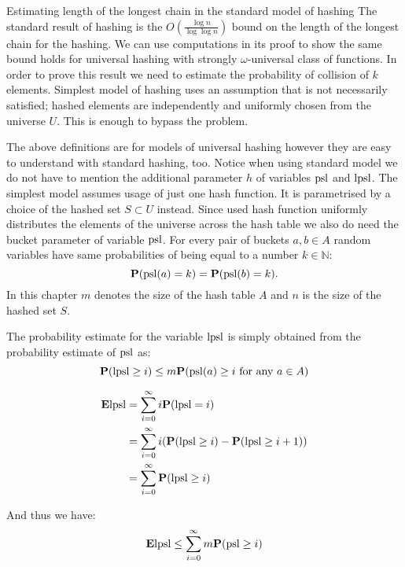 \begin{section}{Estimating length of the longest chain in the standard model of hashing}
The standard result of hashing is the $O\left(\frac{\log n}{\log \log n}\right)$ bound on the length of the longest chain for the hashing. We can use computations in its proof to show the same bound holds for universal hashing with strongly $\omega$-universal class of functions. In order to prove this result we need to estimate the probability of collision of $k$ elements. Simplest model of hashing uses an assumption that is not necessarily satisfied; hashed elements are independently and uniformly chosen from the universe $U$. This is enough to bypass the problem. 

The above definitions are for models of universal hashing however they are easy to understand with standard hashing, too. Notice when using standard model we do not have to mention the additional parameter $h$ of variables $\mathrm{psl}$ and $\mathrm{lpsl}$. The simplest model assumes usage of just one hash function. It is parametrised by a choice of the hashed set $S \subset U$ instead. Since used hash function uniformly distributes the elements of the universe across the hash table we also do need the bucket parameter of variable $\mathrm{psl}$. For every pair of buckets $a, b \in A$ random variables have same probabilities of being equal to a number $k \in \mathbb{N}$: \[\mathbf{P}(\mathrm{psl}(a) = k) = \mathbf{P}(\mathrm{psl}(b) = k) \text{.}\] In this chapter $m$ denotes the size of the hash table $A$ and $n$ is the size of the hashed set $S$.

The probability estimate for the variable $\mathrm{lpsl}$ is simply obtained from the probability estimate of $\mathrm{psl}$ as:
\begin{displaymath}
\mathbf{P}(\mathrm{lpsl} \geq i) \leq m \mathbf{P}(\mathrm{psl}(a) \geq i \text{ for any } a \in A)
\end{displaymath}

\begin{displaymath}
\begin{split}
\mathbf{E} \mathrm{lpsl}
	& = \displaystyle \sum_{i=0}^{\infty} i \mathbf{P}(\mathrm{lpsl} = i) \\
	& = \displaystyle \sum_{i = 0}^{\infty} i (\mathbf{P}(\mathrm{lpsl} \geq i) - \mathbf{P}(\mathrm{lpsl} \geq i + 1)) \\ 
	& = \displaystyle \sum_{i = 0}^{\infty} \mathbf{P}(\mathrm{lpsl} \geq i)
\end{split}
\end{displaymath}

And thus we have:
\begin{displaymath}
\mathbf{E} \mathrm{lpsl} \leq \displaystyle \sum_{i = 0}^{\infty} m \mathbf{P}(\mathrm{psl} \geq i)
\end{displaymath}


\end{section}
